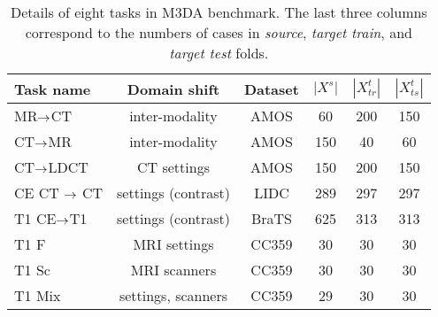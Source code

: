 

\begin{table}[h]
	\centering
	\caption{Details of eight tasks in M3DA benchmark. The last three columns correspond to the numbers of cases in \textit{source}, \textit{target train}, and \textit{target test} folds.}
	
		\begin{tabular}{@{}lccccc@{}}
			\toprule
			\textbf{Task name} & \textbf{Domain shift} & \textbf{Dataset} & $|X^s|$ & $|X^t_{tr}|$ & $|X^t_{ts}|$ \\
			\midrule
			MR$\rightarrow$CT & inter-modality & AMOS & 60 & 200 & 150 \\
			CT$\rightarrow$MR & inter-modality & AMOS & 150 & 40 & 60 \\
			CT$\rightarrow$LDCT & CT settings & AMOS & 150 & 200 & 150 \\
			CE CT $\rightarrow$ CT & settings (contrast) & LIDC & 289 & 297 & 297 \\
			T1 CE$\rightarrow$T1 & settings (contrast) & BraTS & 625 & 313 & 313 \\
			T1 F & MRI settings & CC359 & 30 & 30 & 30 \\
			T1 Sc & MRI scanners & CC359 & 30 & 30 & 30 \\
			T1 Mix & settings, scanners & CC359 & 29 & 30 & 30 \\
			\bottomrule
	\end{tabular}%
	
	\label{tab:setup}
\end{table}
